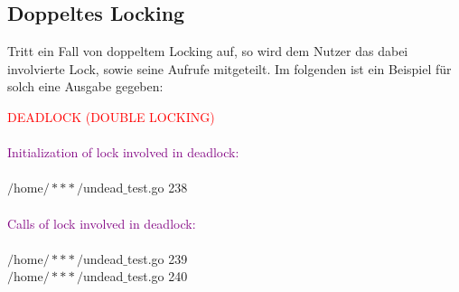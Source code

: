 \subsection{Doppeltes Locking}
Tritt ein Fall von doppeltem Locking auf, so wird dem Nutzer das dabei 
involvierte Lock, sowie seine Aufrufe mitgeteilt. Im folgenden ist ein Beispiel
für solch eine Ausgabe gegeben:
\begin{mdframed}[leftmargin=10pt,rightmargin=10pt]
  \textcolor{red}{DEADLOCK (DOUBLE LOCKING)}\\\\
  \textcolor{purple}{Initialization of lock involved in deadlock:}\\\\
  $/$home$/***/$undead$\_$test.go 238\\\\
  \textcolor{purple}{Calls of lock involved in deadlock:}\\\\
  $/$home$/***/$undead$\_$test.go 239\\
  $/$home$/***/$undead$\_$test.go 240\\\\
\end{mdframed}
